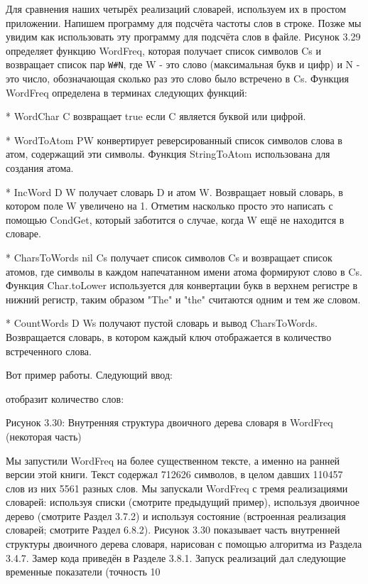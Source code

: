 Для сравнения наших четырёх реализаций словарей, используем их в простом приложении. Напишем программу для подсчёта частоты слов в строке. Позже мы увидим как использовать эту программу для подсчёта слов в файле. Рисунок 3.29 определяет функцию WordFreq, которая получает список символов Cs и возвращает список пар \verb!W#N!, где W - это слово (максимальная букв и цифр) и N - это число, обозначающая сколько раз это слово было встречено в Cs. Функция WordFreq определена в терминах следующих функций:

* {WordChar C} возвращает true если C является буквой или цифрой.

* {WordToAtom PW} конвертирует реверсированный список символов слова в атом, содержащий эти символы. Функция StringToAtom использована для создания атома.

* {IncWord D W} получает словарь D и атом W. Возвращает новый словарь, в котором поле W увеличено на 1. Отметим насколько просто это написать с помощью CondGet, который заботится о случае, когда W ещё не находится в словаре.

* {CharsToWords nil Cs} получает список символов Cs и возвращает список атомов, где символы в каждом напечатанном имени атома формируют слово в Cs. Функция Char.toLower используется для конвертации букв в верхнем регистре в нижний регистр, таким образом "The" и "the" считаются одним и тем же словом.

* {CountWords D Ws} получают пустой словарь и вывод CharsToWords. Возвращается словарь, в котором каждый ключ отображается в количество встреченного слова.

Вот пример работы. Следующий ввод:

отобразит количество слов:

Рисунок 3.30: Внутренняя структура двоичного дерева словаря в WordFreq (некоторая часть)

Мы запустили WordFreq на более существенном тексте, а именно на ранней версии этой книги. Текст содержал 712626 символов, в целом давших 110457 слов из них 5561 разных слов. Мы запускали WordFreq с тремя реализациями словарей: используя списки (смотрите предыдущий пример), используя двоичное дерево (смотрите Раздел 3.7.2) и используя состояние (встроенная реализация словарей; смотрите Раздел 6.8.2). Рисунок 3.30 показывает часть внутренней структуры двоичного дерева словаря, нарисован с помощью алгоритма из Раздела 3.4.7. Замер кода приведён в Разделе 3.8.1. Запуск реализаций дал следующие временные показатели (точность 10%

